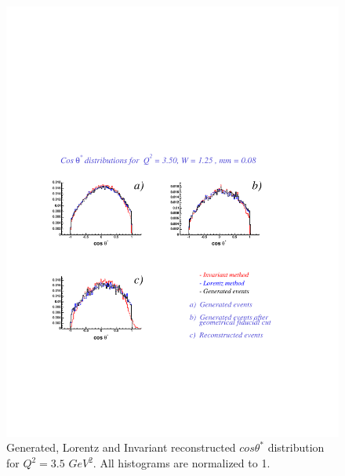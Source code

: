\begin{figure}[h]
 \begin{center}
  \includegraphics[width = 12cm, bb = 60 140 540 540]{appendix/img/ctheta_q23.50_W1.25_mm0.08}
  \caption{Generated, Lorentz and Invariant reconstructed $cos\theta^*$ distribution for $Q^2=3.5$ $GeV^2$.
           All histograms are normalized to 1.}
 \end{center}
\end{figure} 

